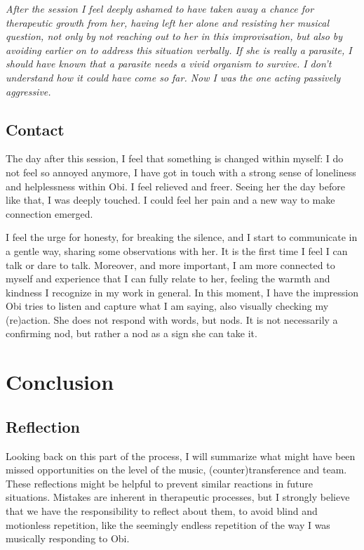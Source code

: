 \documentclass[authordate, empirical, issue]{jote-new-article}
\begin{document}
{\emph{After the session I feel deeply ashamed to have taken away a chance for therapeutic growth from her, having left her alone and resisting her musical question, not only by not reaching out to her in this improvisation, but also by avoiding earlier on to address this situation verbally. If she is really a parasite, I should have known that a parasite needs a vivid organism to survive. I don't understand how it could have come so far. Now I was the one acting passively aggressive. }}




\subsection{Contact}



The day after this session, I feel that something is changed within myself: I do not feel so annoyed anymore, I have got in touch with a strong sense of loneliness and helplessness within Obi. I feel relieved and freer. Seeing her the day before like that, I was deeply touched. I could feel her pain and a new way to make connection emerged.



I feel the urge for honesty, for breaking the silence, and I start to communicate in a gentle way, sharing some observations with her. It is the first time I feel I can talk or dare to talk. Moreover, and more important, I am more connected to myself and experience that I can fully relate to her, feeling the warmth and kindness I recognize in my work in general. In this moment, I have the impression Obi tries to listen and capture what I am saying, also visually checking my (re)action. She does not respond with words, but nods. It is not necessarily a confirming nod, but rather a nod as a sign she can take it.


\section{Conclusion}

\subsection{Reflection}



Looking back on this part of the process, I will summarize what might have been missed opportunities on the level of the music, (counter)transference and team. These reflections might be helpful to prevent similar reactions in future situations. Mistakes are inherent in therapeutic processes, but I strongly believe that we have the responsibility to reflect about them, to avoid blind and motionless repetition, like the seemingly endless repetition of the way I was musically responding to Obi.
\end{document}
